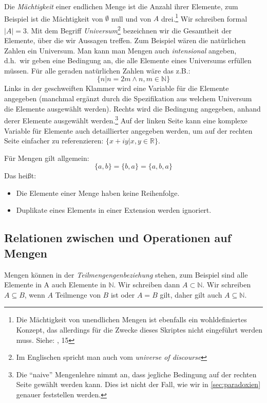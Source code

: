 Die \emph{Mächtigkeit} einer endlichen Menge ist die Anzahl ihrer Elemente,
zum Beispiel ist die Mächtigkeit von $\emptyset$ null und von $A$ drei.\footnote{
    Die Mächtigkeit von unendlichen Mengen ist ebenfalls ein wohldefiniertes Konzept,
    das allerdings für die Zwecke dieses Skriptes nicht eingeführt werden muss.
    Siehe: \cite{link}, 15
}
Wir schreiben formal $|A| = 3$.
Mit dem Begriff \emph{Universum}\footnote{
    Im Englischen spricht man auch vom \emph{universe of discourse}
} bezeichnen wir die Gesamtheit der Elemente,
über die wir Aussagen treffen.
Zum Beispiel wären die natürlichen Zahlen ein Universum.
Man kann man Mengen auch \emph{intensional} angeben,
d.h.\ wir geben eine Bedingung an,
die alle Elemente eines Universums erfüllen müssen.
Für alle geraden natürlichen Zahlen wäre das z.B.:
\[\{n| n = 2m \wedge n,m \in \mathbb{N} \}\]
Links in der geschweiften Klammer wird eine Variable für die Elemente angegeben
(manchmal ergänzt durch die Spezifikation aus welchem Universum die Elemente ausgewählt werden).
Rechts wird die Bedingung angegeben, anhand derer Elemente ausgewählt werden.\footnote{
    Die ``naive'' Mengenlehre nimmt an,
    dass jegliche Bedingung auf der rechten Seite gewählt werden kann.
    Dies ist nicht der Fall, wie wir in \autoref{sec:paradoxien} genauer feststellen werden.
}
Auf der linken Seite kann eine komplexe Variable für Elemente auch detaillierter angegeben werden,
um auf der rechten Seite einfacher zu referenzieren:
$\{x + iy| x,y \in \mathbb{R}\}$.

Für Mengen gilt allgemein:
\[ \{a,b\} = \{b,a\} = \{a,b,a\} \]
Das heißt:
\begin{itemize}
    \item Die Elemente einer Menge haben keine Reihenfolge.
    \item Duplikate eines Elements in einer Extension werden ignoriert.
\end{itemize}



\subsection{Relationen zwischen und Operationen auf Mengen}

Mengen können in der \emph{Teilmengengenbeziehung} stehen,
zum Beispiel sind alle Elemente in A auch Elemente in $\mathbb{N}$.
Wir schreiben dann $A \subset \mathbb{N}$.
Wir schreiben $A \subseteq B$, wenn $A$ Teilmenge von $B$ ist oder $A = B$ gilt,
daher gilt auch $A \subseteq \mathbb{N}$.


